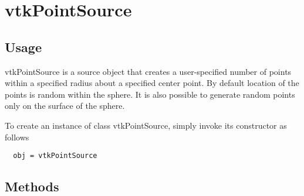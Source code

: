 \section{vtkPointSource}

\subsection{Usage}

 vtkPointSource is a source object that creates a user-specified number 
 of points within a specified radius about a specified center point. 
 By default location of the points is random within the sphere. It is
 also possible to generate random points only on the surface of the
 sphere.

To create an instance of class vtkPointSource, simply
invoke its constructor as follows
\begin{verbatim}
  obj = vtkPointSource
\end{verbatim}
\subsection{Methods}

